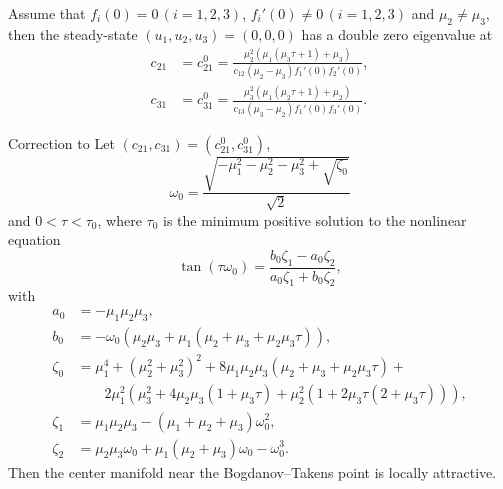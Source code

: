 \begin{lemma}
\label{btdde:lem:BAM_double_eigenvalue}
Assume that $f_{i}(0)=0\,(i=1,2,3)$,
$f_{i}'(0)\neq0\,(i=1,2,3)$ and $\mu_{2}\neq\mu_{3}$, then the steady-state
$(u_{1},u_{2},u_{3})=(0,0,0)$ has a double zero eigenvalue at 
\begin{align*}
c_{21} & =c_{21}^{0}=\frac{\mu_{2}^{2}\left(\mu_{1}\left(\mu_{3}\tau+1\right)+\mu_{3}\right)}{c_{12}\left(\mu_{2}-\mu_{3}\right)f_{1}'(0)f_{2}'(0)},\\
c_{31} & =c_{31}^{0}=\frac{\mu_{3}^{2}\left(\mu_{1}\left(\mu_{2}\tau+1\right)+\mu_{2}\right)}{c_{13}\left(\mu_{3}-\mu_{2}\right)f_{1}'(0)f_{3}'(0)}.
\end{align*}
\end{lemma}

\begin{lemma}
\label{btdde:lemma:triNeuralBAMNetworkModelEigenvalues}
\textup{Correction to \cite[Lemma 3]{dong2013bogdanov}}
Let $(c_{21},c_{31})=(c_{21}^{0},c_{31}^{0})$,
\begin{equation}
    \label{btdde:sm:eq:omega_0} 
    \omega_0 = \frac{\sqrt{-\mu_1^2 - \mu_2^2 - \mu_3^2 + \sqrt{\zeta_0}}}{\sqrt{2}}
\end{equation}
and $0<\tau<\tau_{0}$, where $\tau_0$ is the minimum positive solution to the nonlinear equation
\begin{equation}
    \label{btdde:sm:eq:tan} 
    \tan (\tau \omega_0) = \frac{b_0\zeta_1 - a_0\zeta_2}{a_0\zeta_1 + b_0\zeta_2},
\end{equation}
with
\begin{align*}
a_0 &= -\mu_1\mu_2\mu_3, \\ 
b_0 &= -\omega_0(\mu_2\mu_3 + \mu_1(\mu_2 + \mu_3 + \mu_2\mu_3\tau)), \\
\zeta_0 &= \mu_1^4 + (\mu_2^2 + \mu_3^2)^2 + 8\mu_1\mu_2\mu_3(\mu_2 + \mu_3 + \mu_2\mu_3\tau) + \\
        &\qquad 2\mu_1^2(\mu_3^2 + 4\mu_2\mu_3(1 + \mu_3\tau) + \mu_2^2(1 + 2\mu_3\tau(2 + \mu_3\tau))), \\
\zeta_1 &= \mu_1\mu_2\mu_3 - (\mu_1 + \mu_2 + \mu_3)\omega_0^2, \\
\zeta_2 &= \mu_2\mu_3\omega_0 + \mu_1(\mu_2 + \mu_3)\omega_0 - \omega_0^3.
\end{align*}
Then the center manifold near the Bogdanov--Takens point is locally attractive.
\end{lemma}

